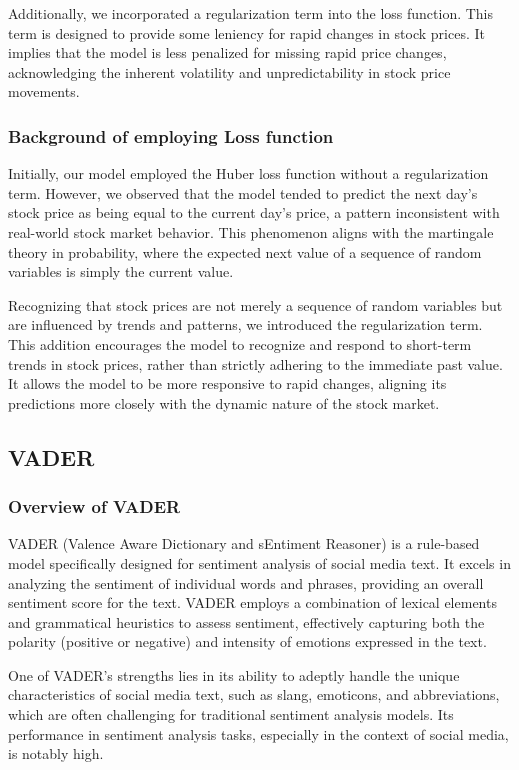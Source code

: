 Additionally, we incorporated a regularization term into the loss function. 
This term is designed to provide some leniency for rapid changes in stock prices. 
It implies that the model is less penalized for missing rapid price changes, acknowledging the inherent volatility and unpredictability in stock price movements.


\subsubsection{Background of employing Loss function}

Initially, our model employed the Huber loss function without a regularization term. 
However, we observed that the model tended to predict the next day's stock price as being equal to the current day's price, a pattern inconsistent with real-world stock market behavior. 
This phenomenon aligns with the martingale theory in probability, where the expected next value of a sequence of random variables is simply the current value.

Recognizing that stock prices are not merely a sequence of random variables but are influenced by trends and patterns, we introduced the regularization term. 
This addition encourages the model to recognize and respond to short-term trends in stock prices, rather than strictly adhering to the immediate past value. 
It allows the model to be more responsive to rapid changes, aligning its predictions more closely with the dynamic nature of the stock market.


\subsection{VADER}

\subsubsection{Overview of VADER}
VADER (Valence Aware Dictionary and sEntiment Reasoner) is a rule-based model specifically designed for sentiment analysis of social media text. 
It excels in analyzing the sentiment of individual words and phrases, providing an overall sentiment score for the text. 
VADER employs a combination of lexical elements and grammatical heuristics to assess sentiment, effectively capturing both the polarity (positive or negative) and intensity of emotions expressed in the text.

One of VADER's strengths lies in its ability to adeptly handle the unique characteristics of social media text, such as slang, emoticons, and abbreviations, which are often challenging for traditional sentiment analysis models. 
Its performance in sentiment analysis tasks, especially in the context of social media, is notably high. 

